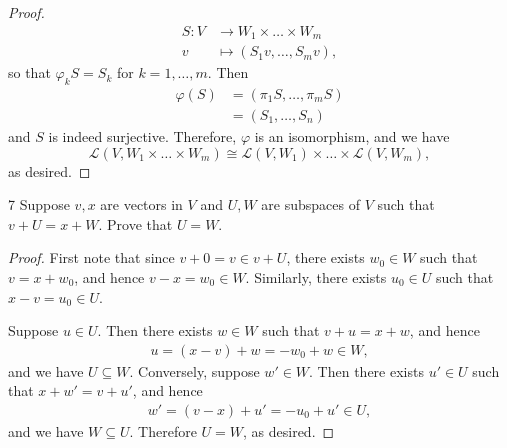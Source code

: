 \documentclass{extarticle}
\newenvironment{problem}[1]{\begin{prob*}{#1}{}}{\end{prob*}}
\newcommand{\Hom}{\mathcal{L}}
\begin{document}
\begin{proof}
\begin{align*}
S: V &\to W_1\times \dots \times W_m\\
    v &\mapsto (S_1v,\dots, S_mv),
\end{align*}
so that $\varphi_k S = S_k$ for $k = 1,\dots, m$.  Then
\begin{align*}
\varphi(S) &= (\pi_1S, \dots, \pi_mS)\\
&= (S_1,\dots, S_n)
\end{align*}
and $S$ is indeed surjective.  Therefore, $\varphi$ is an isomorphism, and we have 
\begin{equation*}
\Hom(V, W_1\times \dots \times W_m)\cong\Hom(V, W_1)\times \dots \times \Hom(V, W_m), 
\end{equation*}
as desired.
\end{proof}

\begin{problem}{7}
Suppose $v,x$ are vectors in $V$ and $U,W$ are subspaces of $V$ such that $v + U = x + W$.  Prove that $U = W$.
\end{problem}
\begin{proof}
First note that since $v + 0 = v\in v + U$, there exists $w_0\in W$ such that $v = x + w_0$, and hence $v - x = w_0\in W$.  Similarly, there exists $u_0\in U$ such that $x - v = u_0 \in U$.
\par Suppose $u\in U$.  Then there exists $w\in W$ such that $v + u = x + w$, and hence
\begin{align*}
u = (x - v) + w = -w_0 + w \in W,
\end{align*}
and we have $U \subseteq W$.  Conversely, suppose $w' \in W$.  Then there exists $u'\in U$ such that $x + w' = v + u'$, and hence
\begin{align*}
w' = (v - x) + u' = -u_0 + u'\in U,
\end{align*}
and we have $W\subseteq U$.  Therefore $U = W$, as desired.
\end{proof}
\end{document}
